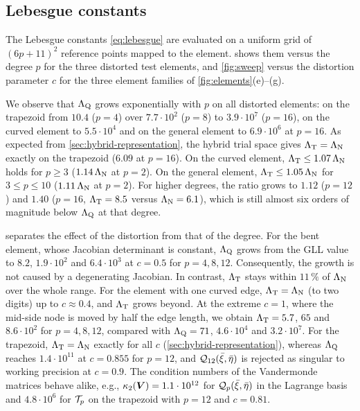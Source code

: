 \subsection{Lebesgue constants}
\label{sec:num-lebesgue}
%
The Lebesgue constants \cref{eq:lebesgue} are evaluated on a uniform grid of $(6p+11)^2$ reference points mapped to the element.  shows them versus the degree $p$ for the three distorted test elements, and \cref{fig:sweep} versus the distortion parameter $c$ for the three element families of \cref{fig:elements}(e)--(g).

We observe that $\Lambda_{\mathrm{Q}}$ grows exponentially with $p$ on all distorted elements: on the trapezoid from $10.4$ ($p=4$) over $7.7\cdot10^{2}$ ($p=8$) to $3.9\cdot10^{7}$ ($p=16$), on the curved element to $5.5\cdot10^{4}$ and on the general element to $6.9\cdot10^{6}$ at $p=16$. As expected from \cref{sec:hybrid-representation}, the hybrid trial space gives $\Lambda_{\mathrm{T}}=\Lambda_{\mathrm{N}}$ exactly on the trapezoid ($6.09$ at $p=16$). On the curved element, $\Lambda_{\mathrm{T}}\le1.07\,\Lambda_{\mathrm{N}}$ holds for $p\ge3$ ($1.14\,\Lambda_{\mathrm{N}}$ at $p=2$). On the general element, $\Lambda_{\mathrm{T}}\le1.05\,\Lambda_{\mathrm{N}}$ for $3\le p\le10$ ($1.11\,\Lambda_{\mathrm{N}}$ at $p=2$). For higher degrees, the ratio grows to $1.12$ ($p=12$) and $1.40$ ($p=16$, $\Lambda_{\mathrm{T}}=8.5$ versus $\Lambda_{\mathrm{N}}=6.1$), which is still almost six orders of magnitude below $\Lambda_{\mathrm{Q}}$ at that degree.

 separates the effect of the distortion from that of the degree. For the bent element, whose Jacobian determinant is constant, $\Lambda_{\mathrm{Q}}$ grows from the GLL value to $8.2$, $1.9\cdot10^{2}$ and $6.4\cdot10^{3}$ at $c=0.5$ for $p=4,8,12$. Consequently, the growth is not caused by a degenerating Jacobian. In contrast, $\Lambda_{\mathrm{T}}$ stays within $11\,\%$ of $\Lambda_{\mathrm{N}}$ over the whole range. For the element with one curved edge, $\Lambda_{\mathrm{T}}=\Lambda_{\mathrm{N}}$ (to two digits) up to $c\approx0.4$, and $\Lambda_{\mathrm{T}}$ grows beyond. At the extreme $c=1$, where the mid-side node is moved by half the edge length, we obtain $\Lambda_{\mathrm{T}}=5.7$, $65$ and $8.6\cdot10^{2}$ for $p=4,8,12$, compared with $\Lambda_{\mathrm{Q}}=71$, $4.6\cdot10^{4}$ and $3.2\cdot10^{7}$. For the trapezoid, $\Lambda_{\mathrm{T}}=\Lambda_{\mathrm{N}}$ exactly for all $c$ (\cref{sec:hybrid-representation}), whereas $\Lambda_{\mathrm{Q}}$ reaches $1.4\cdot10^{11}$ at $c=0.855$ for $p=12$, and $\mathcal Q_{12}(\bar\xi,\bar\eta)$ is rejected as singular to working precision at $c=0.9$. The condition numbers of the Vandermonde matrices behave alike, e.g., $\kappa_2(\bm{V})=1.1\cdot10^{12}$ for $\mathcal Q_p(\bar\xi,\bar\eta)$ in the Lagrange basis and $4.8\cdot10^{6}$ for $\mathcal T_p$ on the trapezoid with $p=12$ and $c=0.81$.

